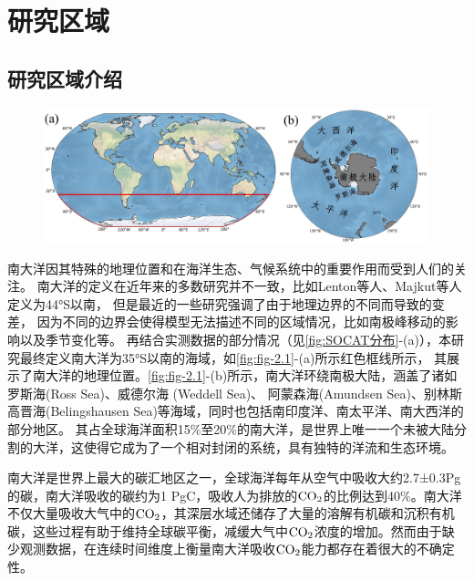 
\section{研究区域}
\subsection{研究区域介绍}
\begin{figure}[H]
    \centering
    \includegraphics[width=\linewidth]{figure/第二章用图/图2.1-1.jpg}
\end{figure}
南大洋因其特殊的地理位置和在海洋生态、气候系统中的重要作用而受到人们的关注\cite{DXJZ201204005,JDYZ200901008,JDYZ200103003}。
南大洋的定义在近年来的多数研究并不一致，比如Lenton等人\cite{lenton2013sea}、Majkut等人\cite{majkut2014observing}定义为44°S以南，
但是最近的一些研究\cite{seferian2012water,sokolov2009circumpolar}强调了由于地理边界的不同而导致的变差，
因为不同的边界会使得模型无法描述不同的区域情况，比如南极峰移动的影响以及季节变化等。
再结合实测数据的部分情况（见\autoref{fig:SOCAT分布}-(a)），本研究最终定义南大洋为35°S以南的海域，如\autoref{fig:fig-2.1}-(a)所示红色框线所示，
其展示了南大洋的地理位置。\autoref{fig:fig-2.1}-(b)所示，南大洋环绕南极大陆，涵盖了诸如罗斯海(Ross Sea)、威德尔海 (Weddell Sea)、
阿蒙森海(Amundsen Sea)、别林斯高晋海(Belingshausen Sea)等海域，同时也包括南印度洋、南太平洋、南大西洋的部分地区。
其占全球海洋面积15\%至20\%的南大洋，是世界上唯一一个未被大陆分割的大洋，这使得它成为了一个相对封闭的系统，具有独特的洋流和生态环境。

南大洋是世界上最大的碳汇地区之一，全球海洋每年从空气中吸收大约2.7±0.3Pg的碳，南大洋吸收的碳约为1 PgC，吸收人为排放的$\rm CO_2$的比例达到40\%\cite{khatiwala2009reconstruction,devries2014oceanic}。南大洋不仅大量吸收大气中的$\rm CO_2$，其深层水域还储存了大量的溶解有机碳和沉积有机碳\cite{JDYZ200103003}，这些过程有助于维持全球碳平衡，减缓大气中$\rm CO_2$浓度的增加。然而由于缺少观测数据，在连续时间维度上衡量南大洋吸收$\rm CO_2$能力都存在着很大的不确定性。

